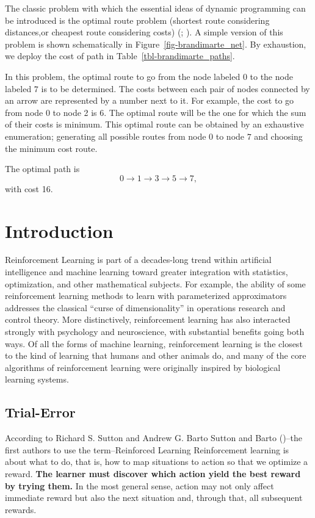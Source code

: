 \documentclass[
  letterpaper,
]{krantz}
\theoremstyle{plain}
\theoremstyle{definition}
\theoremstyle{definition}
\theoremstyle{remark}
\begin{document}
The classic problem with which the essential ideas of dynamic
programming can be introduced is the optimal route problem (shortest
route considering distances,or cheapest route considering costs)
(;
). A simple
version of this problem is shown schematically in
Figure~\ref{fig-brandimarte_net}. By exhaustion, we deploy the cost of
path in Table~\ref{tbl-brandimarte_paths}.

In this problem, the optimal route to go from the node labeled \(0\) to
the node labeled \(7\) is to be determined. The costs between each pair
of nodes connected by an arrow are represented by a number next to it.
For example, the cost to go from node 0 to node 2 is 6. The optimal
route will be the one for which the sum of their costs is minimum. This
optimal route can be obtained by an exhaustive enumeration; generating
all possible routes from node \(0\) to node \(7\) and choosing the
minimum cost route.

The optimal path is \[
  0 \to   1 \to 3 \to 5 \to  7,
\] with cost 16.


\chapter{Introduction}\label{introduction}

Reinforcement Learning is part of a decades-long trend within artificial
intelligence and machine learning toward greater integration with
statistics, optimization, and other mathematical subjects. For example,
the ability of some reinforcement learning methods to learn with
parameterized approximators addresses the classical ``curse of
dimensionality'' in operations research and control theory. More
distinctively, reinforcement learning has also interacted strongly with
psychology and neuroscience, with substantial benefits going both ways.
Of all the forms of machine learning, reinforcement learning is the
closest to the kind of learning that humans and other animals do, and
many of the core algorithms of reinforcement learning were originally
inspired by biological learning systems.

\section{Trial-Error}\label{trial-error}

According to Richard S. Sutton and Andrew G. Barto Sutton and Barto
()--the first authors to use the
term--Reinforced Learning Reinforcement learning is about what to do,
that is, how to map situations to action so that we optimize a reward.
\textbf{The learner must discover which action yield the best reward by
trying them.} In the most general sense, action may not only affect
immediate reward but also the next situation and, through that, all
subsequent rewards.
\end{document}
